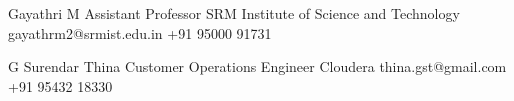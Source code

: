 %
%
%


\begin{referees}
		{Gayathri M}
		{Assistant Professor}
		{SRM Institute of Science and Technology }
		{gayathrm2@srmist.edu.in}
		{+91 95000 91731}


		{G Surendar Thina}
		{Customer Operations Engineer}
		{Cloudera}
		{thina.gst@gmail.com}
		{+91 95432 18330}

\end{referees}